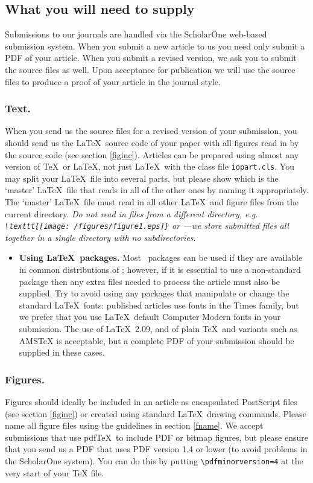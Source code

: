 \documentclass[12pt]{iopart}
\begin{document}
\subsection{What you will need to supply}
Submissions to our journals are handled via the ScholarOne web-based submission system.  When you submit
a new article to us you need only submit a PDF of your article.  When you submit a revised version,
we ask you to submit the source files as well.  Upon acceptance for publication we will use the source files to produce a proof of your article in the journal style. 

\subsubsection{Text.}When you send us the source files for a revised version of your submission,
you should send us the \LaTeX\ source code of your paper with all figures read in by 
the source code (see section \ref{figinc}).  Articles can be prepared using almost any version of \TeX\ or \LaTeX{},
not just \LaTeX\ with the class file \verb"iopart.cls".  You may split your \LaTeX\ file into several parts, but please show
which is the `master' \LaTeX\ file that reads in all of the other ones by naming it appropriately.  The `master'
\LaTeX\ file must read in all other \LaTeX\ and figure files from the current directory.  {\it Do not read in files from a different directory, e.g. \verb"\texttt{[image: /figures/figure1.eps]}" or
\verb""---we store submitted files
all together in a single directory with no subdirectories}.
\begin{itemize}
\item {\bf Using \LaTeX\ packages.} Most \LaTeXe\ packages can be used if they are 
available in common distributions of \LaTeXe; however, if it is essential to use 
a non-standard package then any extra files needed to process the article must 
also be supplied.  Try to avoid using any packages that manipulate or change the standard
\LaTeX\ fonts: published articles use fonts in the Times family, but we prefer that you 
use \LaTeX\ default Computer Modern fonts in your submission.  The use of \LaTeX\ 2.09, and of plain
\TeX\ and variants such as AMSTeX is acceptable, but a complete PDF of your submission should be supplied in these cases.
\end{itemize}
\subsubsection{Figures.} Figures should ideally be included in an article as encapsulated PostScript files
(see section \ref{figinc}) or created using standard \LaTeX\ drawing commands. 
 Please name all figure files using the guidelines in section \ref{fname}.
We accept submissions that use pdf\TeX\ to include
PDF or bitmap figures, but please ensure that you send us a PDF that uses PDF version 1.4 or lower
(to avoid problems in the ScholarOne system).
You can do this by putting \verb"\pdfminorversion=4" at the very start of your TeX file.
\end{document}
